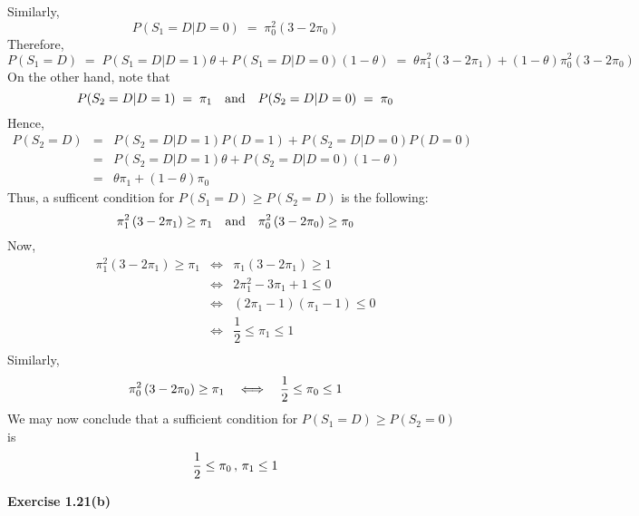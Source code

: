 Similarly,
\begin{equation*}
P(S_{1} = D \vert D = 0) \;=\; \pi_{0}^{2}\left(3 - 2\pi_{0}\right)
\end{equation*}
Therefore,
\begin{equation*}
P(S_{1} = D)
\;=\; P(S_{1} = D \vert D = 1)\theta + P(S_{1} = D \vert D = 0)(1 - \theta)
\;=\; \theta\pi_{1}^{2}\left(3 - 2\pi_{1}\right) + (1 - \theta)\pi_{0}^{2}\left(3 - 2\pi_{0}\right)
\end{equation*}
On the other hand, note that
\begin{equation*}
P(S_{2} = D \vert D = 1) \; = \; \pi_{1}
\quad\textnormal{and}\quad
P(S_{2} = D \vert D = 0) \; = \; \pi_{0}
\end{equation*}
Hence,
\begin{eqnarray*}
P(S_{2} = D)
& = & P(S_{2} = D \vert D = 1)P(D =1) + P(S_{2} = D \vert D = 0)P(D=0) \\
& = & P(S_{2} = D \vert D = 1)\theta + P(S_{2} = D \vert D = 0)(1 - \theta) \\
& = & \theta\pi_{1} + (1 - \theta)\pi_{0}
\end{eqnarray*}
Thus, a sufficent condition for $P(S_{1} = D) \geq P(S_{2} = D)$ is the following:
\begin{equation*}
\pi_{1}^{2}\left(3 - 2\pi_{1}\right) \geq \pi_{1}
\quad\textnormal{and}\quad
\pi_{0}^{2}\left(3 - 2\pi_{0}\right) \geq \pi_{0}
\end{equation*}
Now,
\begin{eqnarray*}
                      \pi_{1}^{2}\left(3 - 2\pi_{1}\right) \geq \pi_{1}
&\Longleftrightarrow& \pi_{1}\left(3 - 2\pi_{1}\right) \geq 1 \\
&\Longleftrightarrow& 2\pi_{1}^{2} - 3\pi_{1} + 1 \leq 0 \\
&\Longleftrightarrow& (2\pi_{1} - 1)(\pi_{1} - 1) \leq 0 \\
&\Longleftrightarrow& \dfrac{1}{2} \leq \pi_{1} \leq 1 \\
\end{eqnarray*}
Similarly,
\begin{equation*}
\pi_{0}^{2}\left(3 - 2\pi_{0}\right) \geq \pi_{1}
\quad\Longleftrightarrow\quad
\dfrac{1}{2} \leq \pi_{0} \leq 1 \\
\end{equation*}
We may now conclude that a sufficient condition for $P(S_{1} = D) \geq P(S_{2} = 0)$ is
\begin{equation*}
\dfrac{1}{2} \leq \pi_{0} \,,\, \pi_{1} \leq 1 \\
\end{equation*}



\vskip 1.0cm
\noindent
\textbf{Exercise 1.21(b)}

\vskip 0.5cm
\noindent


